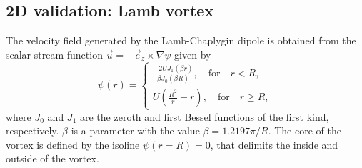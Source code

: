 \documentclass[preprint,12pt]{elsarticle}
\begin{document}
\subsection{2D validation: Lamb vortex}

The velocity field generated by the Lamb-Chaplygin dipole is obtained from the scalar stream function $\vec{u} = -\vec{e}_z\times \nabla \psi$ given by
\begin{equation}
    \psi(r) = \begin{cases}
    \frac{-2UJ_1(\beta r)}{\beta J_0(\beta R)}, \quad \text{for} \quad r < R,\\
    U\left(\frac{R^2}{r}-r\right), \quad \text{for} \quad r \ge R,    \end{cases}
\end{equation}
where $J_0$ and $J_1$ are the zeroth and first Bessel functions of the first kind, respectively. $\beta$ is a parameter with the value $\beta=1.2197\pi/R$. The core of the vortex is defined by the isoline $\psi(r=R)=0$, that delimits the inside and outside of the vortex.
\end{document}
